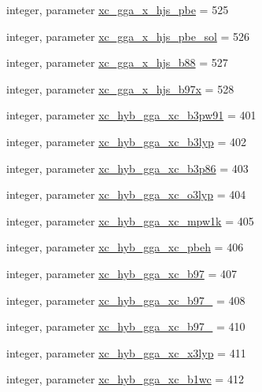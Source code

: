 \begin{DoxyCompactItemize}
\item 
integer, parameter \hyperlink{classlibxc__funcs__m_a5a783d1dc9611f9e37b7e7afac47491e}{xc\-\_\-gga\-\_\-x\-\_\-hjs\-\_\-pbe} = 525
\item 
integer, parameter \hyperlink{classlibxc__funcs__m_a6d1be1d6896045ff4d5f662d62faa8ec}{xc\-\_\-gga\-\_\-x\-\_\-hjs\-\_\-pbe\-\_\-sol} = 526
\item 
integer, parameter \hyperlink{classlibxc__funcs__m_ad8b00ab7d5f8e8df0552c83acae60d0e}{xc\-\_\-gga\-\_\-x\-\_\-hjs\-\_\-b88} = 527
\item 
integer, parameter \hyperlink{classlibxc__funcs__m_a096b2c3ec6e4958d9c2f63131e5875ec}{xc\-\_\-gga\-\_\-x\-\_\-hjs\-\_\-b97x} = 528
\item 
integer, parameter \hyperlink{classlibxc__funcs__m_acf88ed58efb151c02df9b04122339392}{xc\-\_\-hyb\-\_\-gga\-\_\-xc\-\_\-b3pw91} = 401
\item 
integer, parameter \hyperlink{classlibxc__funcs__m_af66d5abbc9b49686300615eb6cff2cf3}{xc\-\_\-hyb\-\_\-gga\-\_\-xc\-\_\-b3lyp} = 402
\item 
integer, parameter \hyperlink{classlibxc__funcs__m_ade5bcc9b5cc0b1eb4742ccb340b2c521}{xc\-\_\-hyb\-\_\-gga\-\_\-xc\-\_\-b3p86} = 403
\item 
integer, parameter \hyperlink{classlibxc__funcs__m_a41a0ef59ddf274bfada79c8921f718ef}{xc\-\_\-hyb\-\_\-gga\-\_\-xc\-\_\-o3lyp} = 404
\item 
integer, parameter \hyperlink{classlibxc__funcs__m_accb88c7ef29718e3e3e43b7233c9dec3}{xc\-\_\-hyb\-\_\-gga\-\_\-xc\-\_\-mpw1k} = 405
\item 
integer, parameter \hyperlink{classlibxc__funcs__m_ab38a079e7d239698a74ca7c24aff41da}{xc\-\_\-hyb\-\_\-gga\-\_\-xc\-\_\-pbeh} = 406
\item 
integer, parameter \hyperlink{classlibxc__funcs__m_aa1a55c789268f6129a5ac6f9d41d7262}{xc\-\_\-hyb\-\_\-gga\-\_\-xc\-\_\-b97} = 407
\item 
integer, parameter \hyperlink{classlibxc__funcs__m_a33a58af2641c9f656965eec96cb4036b}{xc\-\_\-hyb\-\_\-gga\-\_\-xc\-\_\-b97\-\_} = 408
\item 
integer, parameter \hyperlink{classlibxc__funcs__m_a7a3bc312c433d8ec147f8b9a4a85892d}{xc\-\_\-hyb\-\_\-gga\-\_\-xc\-\_\-b97\-\_} = 410
\item 
integer, parameter \hyperlink{classlibxc__funcs__m_ae6254784389c0ca1b86c5ab787370279}{xc\-\_\-hyb\-\_\-gga\-\_\-xc\-\_\-x3lyp} = 411
\item 
integer, parameter \hyperlink{classlibxc__funcs__m_a1dd2a5b591895ca31ce079e23c543ceb}{xc\-\_\-hyb\-\_\-gga\-\_\-xc\-\_\-b1wc} = 412

\end{DoxyCompactItemize}
